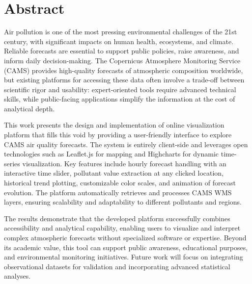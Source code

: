 \thispagestyle{empty}

\chapter*{Abstract}
Air pollution is one of the most pressing environmental challenges of the 21st century, with significant impacts on human health, ecosystems, and climate. Reliable forecasts are essential to support public policies, raise awareness, and inform daily decision-making. The Copernicus Atmosphere Monitoring Service (CAMS) provides high-quality forecasts of atmospheric composition worldwide, but existing platforms for accessing these data often involve a trade-off between scientific rigor and usability: expert-oriented tools require advanced technical skills, while public-facing applications simplify the information at the cost of analytical depth.

This work presents the design and implementation of online visualization platform that fills this void by providing a user-friendly interface to explore CAMS air quality forecasts. The system is entirely client-side and leverages open technologies such as Leaflet.js for mapping and Highcharts for dynamic time-series visualization. Key features include hourly forecast handling with an interactive time slider, pollutant value extraction at any clicked location, historical trend plotting, customizable color scales, and animation of forecast evolution. The platform automatically retrieves and processes CAMS WMS layers, ensuring scalability and adaptability to different pollutants and regions.

The results demonstrate that the developed platform successfully combines accessibility and analytical capability, enabling users to visualize and interpret complex atmospheric forecasts without specialized software or expertise. Beyond its academic value, this tool can support public awareness, educational purposes, and environmental monitoring initiatives. Future work will focus on integrating observational datasets for validation and incorporating advanced statistical analyses.


\clearpage
\thispagestyle{empty}
\hfill
\clearpage